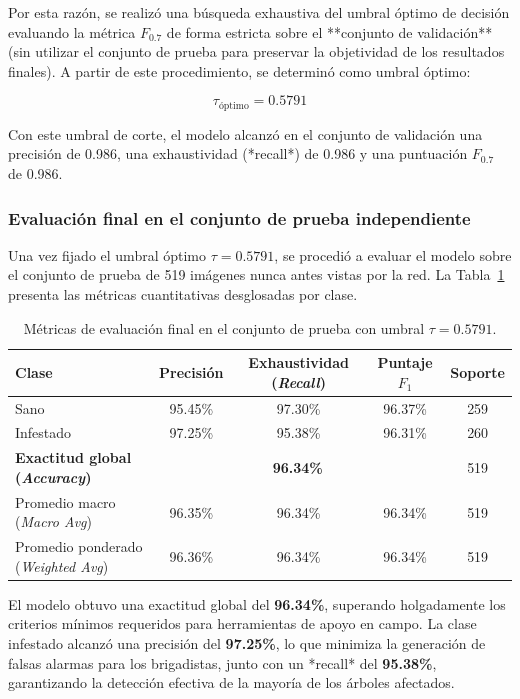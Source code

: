 Por esta razón, se realizó una búsqueda exhaustiva del umbral óptimo de decisión evaluando la métrica $F_{0.7}$ de forma estricta sobre el **conjunto de validación** (sin utilizar el conjunto de prueba para preservar la objetividad de los resultados finales). A partir de este procedimiento, se determinó como umbral óptimo:

\begin{equation}
    \tau_{\text{óptimo}} = 0.5791
\end{equation}

Con este umbral de corte, el modelo alcanzó en el conjunto de validación una precisión de 0.986, una exhaustividad (*recall*) de 0.986 y una puntuación $F_{0.7}$ de 0.986.

\subsubsection{Evaluación final en el conjunto de prueba independiente}
\label{subsubsec:evaluacion-test}

Una vez fijado el umbral óptimo $\tau = 0.5791$, se procedió a evaluar el modelo sobre el conjunto de prueba de 519 imágenes nunca antes vistas por la red. La Tabla~\ref{tab:metricas_test} presenta las métricas cuantitativas desglosadas por clase.

\begin{table}[H]
\centering
\small
\setlength{\tabcolsep}{5pt}
\caption{Métricas de evaluación final en el conjunto de prueba con umbral $\tau = 0.5791$.}
\label{tab:metricas_test}
\renewcommand{\arraystretch}{1.2}
\begin{tabular}{|l|c|c|c|c|}
\hline
\textbf{Clase} & \textbf{Precisión} & \textbf{Exhaustividad (\textit{Recall})} & \textbf{Puntaje $F_1$} & \textbf{Soporte} \\
\hline
Sano & 95.45\% & 97.30\% & 96.37\% & 259 \\
\hline
Infestado & 97.25\% & 95.38\% & 96.31\% & 260 \\
\hline
\textbf{Exactitud global (\textit{Accuracy})} & \multicolumn{3}{c|}{\textbf{96.34\%}} & 519 \\
\hline
Promedio macro (\textit{Macro Avg}) & 96.35\% & 96.34\% & 96.34\% & 519 \\
\hline
Promedio ponderado (\textit{Weighted Avg}) & 96.36\% & 96.34\% & 96.34\% & 519 \\
\hline
\end{tabular}
\end{table}

El modelo obtuvo una exactitud global del \textbf{96.34\%}, superando holgadamente los criterios mínimos requeridos para herramientas de apoyo en campo. La clase infestado alcanzó una precisión del \textbf{97.25\%}, lo que minimiza la generación de falsas alarmas para los brigadistas, junto con un *recall* del \textbf{95.38\%}, garantizando la detección efectiva de la mayoría de los árboles afectados.

